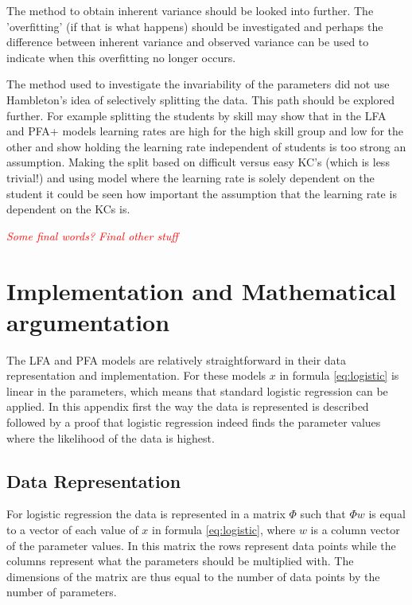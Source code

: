\documentclass{scrartcl}
\newcommand\todo[1]{\textit{\textcolor{red}{#1}}}
\begin{document}
The method to obtain inherent variance should be looked into further. The 'overfitting' (if that is what happens) should be investigated and perhaps the difference between inherent variance and observed variance can be used to indicate when this overfitting no longer occurs.

The method used to investigate the invariability of the parameters did not use Hambleton's idea of selectively splitting the data. This path should be explored further. For example splitting the students by skill may show that in the LFA and PFA+ models learning rates are high for the high skill group and low for the other and show holding the learning rate independent of students is too strong an assumption. Making the split based on difficult versus easy KC's (which is less trivial!) and using model where the learning rate is solely dependent on the student it could be seen how important the assumption that the learning rate is dependent on the KCs is. 

\todo{Some final words? Final other stuff}


\newpage
\appendix
\section{Implementation and Mathematical argumentation}
\label{app:math}
The LFA and PFA models are relatively straightforward in their data representation and implementation. For these models $x$ in formula \ref{eq:logistic} is linear in the parameters, which means that standard logistic regression can be applied. In this appendix first the way the data is represented is described followed by a proof that logistic regression indeed finds the parameter values where the likelihood of the data is highest. 
\subsection{Data Representation}
For logistic regression the data is represented in a matrix $\Phi$ such that $\Phi w$ is equal to a vector of each value of $x$ in formula \ref{eq:logistic}, where $w$ is a column vector of the parameter values. 
In this matrix the rows represent data points while the columns represent what the parameters should be multiplied with. The dimensions of the matrix are thus equal to the number of data points by the number of parameters.
\end{document}
